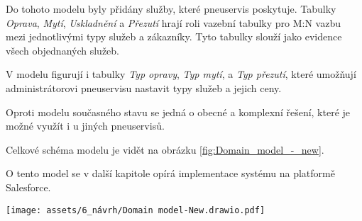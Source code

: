 Do tohoto modelu byly přidány služby, které pneuservis poskytuje. Tabulky \emph{Oprava}, \emph{Mytí}, \emph{Uskladnění} a \emph{Přezutí} hrají roli vazební tabulky pro M:N vazbu mezi jednotlivými typy služeb a zákazníky. Tyto tabulky slouží jako evidence všech objednaných služeb.

V modelu figurují i tabulky \emph{Typ opravy}, \emph{Typ mytí}, a \emph{Typ přezutí}, které umožňují administrátorovi pneuservisu nastavit typy služeb a jejich ceny.

Oproti modelu současného stavu se jedná o obecné a komplexní řešení, které je možné využít i u jiných pneuservisů.

Celkové schéma modelu je vidět na obrázku \ref{fig:Domain_model_-_new}.

O tento model se v další kapitole opírá implementace systému na platformě Salesforce.

\begin{sidewaysfigure}[h!]
    \centering
    \texttt{[image: assets/6\_návrh/Domain model-New.drawio.pdf]}
    \caption{Doménový model -- budoucí stav.}
    \label{fig:Domain_model_-_new}
\end{sidewaysfigure}
